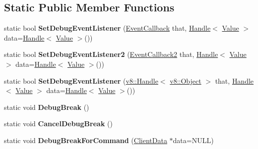 \subsection*{Static Public Member Functions}
\begin{DoxyCompactItemize}
\item 
\hypertarget{classv8_1_1_debug_a745bc83ba29626b64151a1a3e9759e8a}{}static bool {\bfseries Set\+Debug\+Event\+Listener} (\hyperlink{classv8_1_1_debug_a4be52510b70764b730dd1289bd9bbe37}{Event\+Callback} that, \hyperlink{classv8_1_1_handle}{Handle}$<$ \hyperlink{classv8_1_1_value}{Value} $>$ data=\hyperlink{classv8_1_1_handle}{Handle}$<$ \hyperlink{classv8_1_1_value}{Value} $>$())\label{classv8_1_1_debug_a745bc83ba29626b64151a1a3e9759e8a}

\item 
\hypertarget{classv8_1_1_debug_aff46ffb7c2a8e9c6549a7ef74452fce5}{}static bool {\bfseries Set\+Debug\+Event\+Listener2} (\hyperlink{classv8_1_1_debug_aae787219311eeedcbbe2c63cf36d1e53}{Event\+Callback2} that, \hyperlink{classv8_1_1_handle}{Handle}$<$ \hyperlink{classv8_1_1_value}{Value} $>$ data=\hyperlink{classv8_1_1_handle}{Handle}$<$ \hyperlink{classv8_1_1_value}{Value} $>$())\label{classv8_1_1_debug_aff46ffb7c2a8e9c6549a7ef74452fce5}

\item 
\hypertarget{classv8_1_1_debug_a9195f4cb819848a07dc71a5bae43274d}{}static bool {\bfseries Set\+Debug\+Event\+Listener} (\hyperlink{classv8_1_1_handle}{v8\+::\+Handle}$<$ \hyperlink{classv8_1_1_object}{v8\+::\+Object} $>$ that, \hyperlink{classv8_1_1_handle}{Handle}$<$ \hyperlink{classv8_1_1_value}{Value} $>$ data=\hyperlink{classv8_1_1_handle}{Handle}$<$ \hyperlink{classv8_1_1_value}{Value} $>$())\label{classv8_1_1_debug_a9195f4cb819848a07dc71a5bae43274d}

\item 
\hypertarget{classv8_1_1_debug_a4db63a9c8002f967e34bd795c2d9387b}{}static void {\bfseries Debug\+Break} ()\label{classv8_1_1_debug_a4db63a9c8002f967e34bd795c2d9387b}

\item 
\hypertarget{classv8_1_1_debug_a75b02e7d148bb5d882fa3e7a24ff500b}{}static void {\bfseries Cancel\+Debug\+Break} ()\label{classv8_1_1_debug_a75b02e7d148bb5d882fa3e7a24ff500b}

\item 
\hypertarget{classv8_1_1_debug_a18287f492e1fc709d4a8bba87246ffd3}{}static void {\bfseries Debug\+Break\+For\+Command} (\hyperlink{classv8_1_1_debug_1_1_client_data}{Client\+Data} $\ast$data=N\+U\+L\+L)\label{classv8_1_1_debug_a18287f492e1fc709d4a8bba87246ffd3}


\end{DoxyCompactItemize}
